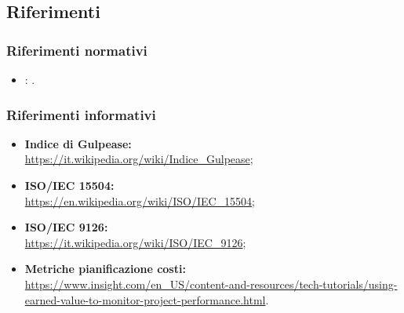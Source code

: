 \subsection{Riferimenti}

\subsubsection{Riferimenti normativi}
\begin{itemize}
	\item \textbf{\NdP}: .
\end{itemize}

\subsubsection{Riferimenti informativi}
\sloppy
\begin{itemize}
	\item \textbf{Indice di Gulpease:}\\
	\url{https://it.wikipedia.org/wiki/Indice_Gulpease};
	\item \textbf{ISO/IEC 15504:}\\
	\url{https://en.wikipedia.org/wiki/ISO/IEC_15504};
	\item \textbf{ISO/IEC 9126:}\\
	\url{https://it.wikipedia.org/wiki/ISO/IEC_9126};
	\item \textbf{Metriche pianificazione costi:}\\
	\url{https://www.insight.com/en_US/content-and-resources/tech-tutorials/using-earned-value-to-monitor-project-performance.html}.
\end{itemize}
\fussy